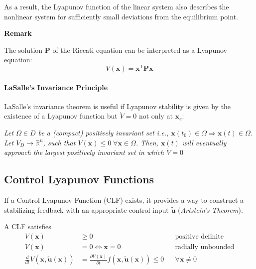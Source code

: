\newpar{}
As a result, the Lyapunov function of the linear system also describes the nonlinear system for sufficiently small deviations from the equilibrium point.

\newpar{}
\textbf{Remark}

The solution $\mathbf{P}$ of the Riccati equation can be interpreted as a Lyapunov equation:
\noindent\begin{equation*}
    V(\mathbf{x}) = \mathbf{x}^{\mathsf{T}} \mathbf{Px}
\end{equation*}

\paragraph{LaSalle's Invariance Principle}
LaSalle's invariance theorem is useful if Lyapunov stability is given by the existence of a Lyapunov function but $\dot{V}=0$ not only at $\mathbf{x}_e$:

\newpar{}
\textit{Let $\Omega\in D$ be a (compact) positively invariant set i.e., $\mathbf{x}(t_0)\in \Omega \Rightarrow \mathbf{x}(t)\in\Omega$.
    Let $V_D\to \mathbb{R}^n$, such that $V(\mathbf{x})\leq 0\; \forall \mathbf{x}\in \Omega$.
    Then, $\mathbf{x}(t)$ will eventually approach the largest positively invariant set in which $\dot{V}=0$
}

\subsection{Control Lyapunov Functions}
If a Control Lyapunov Function (CLF) exists, it provides a way to construct a stabilizing feedback with an appropriate control input $\tilde{\mathbf{u}}$ (\textit{Artstein's Theorem}).

\newpar{}
A CLF satisfies
\noindent\begin{align*}
    V(\mathbf{x})                                              & \geq 0                                                                                           &  & \text{positive definite}  \\
    V(\mathbf{x})                                              & = 0 \Leftrightarrow \mathbf{x} = 0                                                               &  & \text{radially unbounded} \\
    \frac{d}{dt} V(\mathbf{x}, \tilde{\mathbf{u}}(\mathbf{x})) & = \frac{\partial V(\mathbf{x})}{\partial t} f(\mathbf{x}, \tilde{\mathbf{u}}(\mathbf{x})) \leq 0 &  & \forall \mathbf{x}\neq 0
\end{align*}

